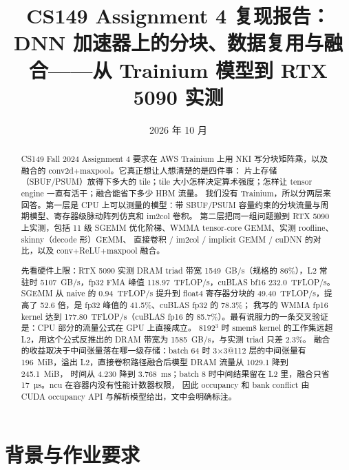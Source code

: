 \documentclass[11pt,a4paper]{ctexart}
\title{CS149 Assignment 4 复现报告：\\DNN 加速器上的分块、数据复用与融合——从 Trainium 模型到 RTX 5090 实测}
\author{\authorline}
\date{2026 年 10 月}
\begin{document}
\maketitle

\begin{abstract}
CS149 Fall 2024 Assignment 4 要求在 AWS Trainium 上用 NKI 写分块矩阵乘，以及融合的 conv2d+maxpool。它真正想让人想清楚的是四件事：
片上存储（SBUF/PSUM）放得下多大的 tile；tile 大小怎样决定算术强度；怎样让 tensor engine 一直有活干；融合能省下多少 HBM 流量。
我们没有 Trainium，所以分两层来回答。第一层是 CPU 上可以测量的模型：带 SBUF/PSUM 容量约束的分块流量与周期模型、寄存器级脉动阵列仿真和 im2col 卷积。
第二层把同一组问题搬到 RTX 5090 上实测，包括 11 级 SGEMM 优化阶梯、WMMA tensor-core GEMM、实测 roofline、skinny（decode 形）GEMM、
直接卷积 / im2col / implicit GEMM / cuDNN 的对比，以及 conv+ReLU+maxpool 融合。

先看硬件上限：RTX 5090 实测 DRAM triad 带宽 1549~GB/s（规格的 86\%），L2 常驻时 5107~GB/s，fp32 FMA 峰值 118.97~TFLOP/s，cuBLAS bf16 232.0~TFLOP/s。
SGEMM 从 naive 的 0.94~TFLOP/s 提升到 float4 寄存器分块的 49.40~TFLOP/s，提高了 52.6 倍，是 fp32 峰值的 41.5\%、cuBLAS fp32 的 78.3\%；
我写的 WMMA fp16 kernel 达到 177.80~TFLOP/s（cuBLAS fp16 的 85.7\%）。最有说服力的一条交叉验证是：CPU 部分的流量公式在 GPU 上直接成立。
8192$^3$ 时 smem8 kernel 的工作集远超 L2，用这个公式反推出的 DRAM 带宽为 1585~GB/s，与实测 triad 只差 2.3\%。
融合的收益取决于中间张量落在哪一级存储：batch 64 时 3$\times$3@112 层的中间张量有 196~MiB，溢出 L2，直接卷积路径融合后模型 DRAM 流量从 1029.1 降到 245.1~MiB，
时间从 4.230 降到 3.768~ms；batch 8 时中间结果留在 L2 里，融合只省 17~µs。ncu 在容器内没有性能计数器权限，
因此 occupancy 和 bank conflict 由 CUDA occupancy API 与解析模型给出，文中会明确标注。
\end{abstract}

\tableofcontents
\newpage

\section{背景与作业要求}
\end{document}
